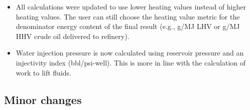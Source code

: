 \documentclass[11pt]{report}
\begin{document}
\begin{itemize}
\item All calculations were updated to use lower heating values instead of higher heating values. The user can still choose the heating value metric for the denominator energy content of the final result (e.g., g/MJ LHV or g/MJ HHV crude oil delivered to refinery).

\item Water injection pressure is now calculated using reservoir pressure and an injectivity index (bbl/psi-well). This is more in line with the calculation of work to lift fluids.

\end{itemize}

\subsection{Minor changes}
\end{document}
